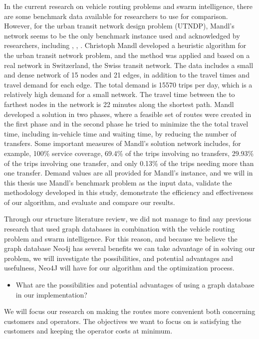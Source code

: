 In the current research on vehicle routing problems and swarm intelligence, there are some benchmark data available for researchers to use for comparison. However, for the urban transit network design problem (UTNDP), Mandl's network seems to be the only benchmark instance used and acknowledged by researchers, including \citep{fan09}, \citep{kechagiopoulos14}, \citep{nikolic14}. Christoph Mandl \citep{mandl79} developed a heuristic algorithm for the urban transit network problem, and the method was applied and based on a real network in Switzerland, the Swiss transit network\citep{mandl80}. The data includes a small and dense network of 15 nodes and 21 edges, in addition to the travel times and travel demand for each edge. The total demand is 15570 trips per day, which is a relatively high demand for a small network. The travel time between the to farthest nodes in the network is 22 minutes along the shortest path. Mandl developed a solution in two phases, where a feasible set of routes were created in the first phase and in the second phase he tried to minimize the the total travel time, including in-vehicle time and waiting time, by reducing the number of transfers. Some important measures of Mandl's solution network includes, for example, 100\% service coverage, 69.4\% of the trips involving no transfers, 29.93\% of the trips involving one transfer, and only 0.13\% of the trips needing more than one transfer. Demand values are all provided for Mandl's instance, and we will in this thesis use Mandl's benchmark problem \citep{mandl79} as the input data, validate the methodology developed in this study, demonstrate the efficiency and effectiveness of our algorithm, and evaluate and compare our results. 

Through our structure literature review, we did not manage to find any previous research that used graph databases in combination with the vehicle routing problem and swarm intelligence. For this reason, and because we believe the graph database Neo4j \citep{website:neo4j} has several benefits we can take advantage of in solving our problem, we will investigate the possibilities, and potential advantages and usefulness, Neo4J will have for our algorithm and the optimization process.
\begin{itemize}
\item What are the possibilities and potential advantages of using a graph database in our implementation?
\end{itemize}

We will focus our research on making the routes more convenient both concerning customers and operators. The objectives we want to focus on is satisfying the customers and keeping the operator costs at minimum. 

